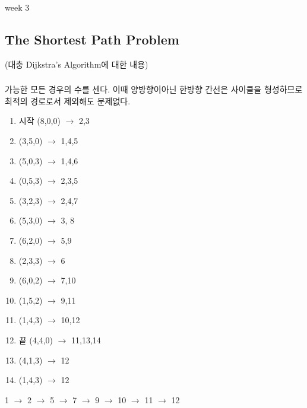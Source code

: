 \subsubsection{} 

week 3
\subsection{The Shortest Path Problem }
(대충 Dijkstra's Algorithm에 대한 내용)
\subsubsection{} 
%
\subsubsection{} 
%
\subsubsection{} 
%
\subsubsection{} 
%
\subsubsection{} 

가능한 모든 경우의 수를 센다. 이때 양방향이아닌 한방향 간선은 사이클을 형성하므로 최적의 경로로서 제외해도 문제없다.

\begin{enumerate}
    \item 시작 (8,0,0) $\rightarrow$ 2,3
    \item (3,5,0) $\rightarrow$ 1,4,5
    \item (5,0,3) $\rightarrow$ 1,4,6
    \item (0,5,3) $\rightarrow$ 2,3,5
    \item (3,2,3) $\rightarrow$ 2,4,7
    \item (5,3,0) $\rightarrow$ 3, 8
    \item (6,2,0) $\rightarrow$ 5,9
    \item (2,3,3) $\rightarrow$ 6
    \item (6,0,2) $\rightarrow$ 7,10
    \item (1,5,2) $\rightarrow$ 9,11
    \item (1,4,3) $\rightarrow$ 10,12
    \item 끝 (4,4,0) $\rightarrow$ 11,13,14
    \item (4,1,3) $\rightarrow$ 12
    \item (1,4,3) $\rightarrow$ 12
\end{enumerate} 
1 $\rightarrow$ 2 $\rightarrow$ 5 $\rightarrow$ 7 $\rightarrow$ 9 $\rightarrow$ 10 $\rightarrow$ 11 $\rightarrow$ 12
